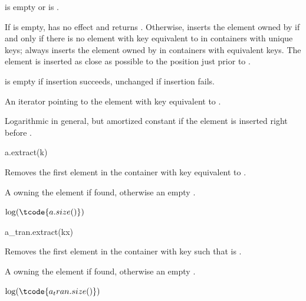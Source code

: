 \begin{itemdescr}
\pnum
\result
{}

\pnum
\expects
{} is empty or
 is .

\pnum
\effects
If  is empty, has no effect and returns .
Otherwise, inserts the element owned by  if and only if
there is no element with key equivalent to 
in containers with unique keys;
always inserts the element owned by 
in containers with equivalent keys.
The element is inserted as close as possible to
the position just prior to .

\pnum
\ensures
{} is empty if insertion succeeds, unchanged if insertion fails.

\pnum
\returns
An iterator pointing to the element with key equivalent to .

\pnum
\complexity
Logarithmic in general, but
amortized constant if the element is inserted right before .
\end{itemdescr}


%
\begin{itemdecl}
a.extract(k)
\end{itemdecl}

\begin{itemdescr}
\pnum
\result
{}

\pnum
\effects
Removes the first element in the container with key equivalent to .

\pnum
\returns
A  owning the element if found,
otherwise an empty .

\pnum
\complexity
$\log (\tcode{a.size()})$
\end{itemdescr}

%
\begin{itemdecl}
a_tran.extract(kx)
\end{itemdecl}

\begin{itemdescr}
\pnum
\result
{}

\pnum
\effects
Removes the first element in the container with key 
such that  is .

\pnum
\returns
A  owning the element if found,
otherwise an empty .

\pnum
\complexity
$\log(\tcode{a_tran.size()})$
\end{itemdescr}


